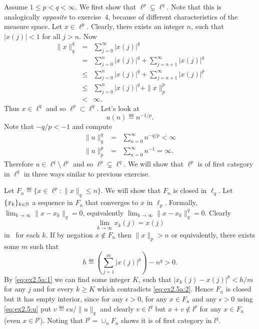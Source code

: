 \begin{enumerate}
Assume \(1\leq p < q < \infty\).
We first show that \(\ell^p \subsetneq \ell^q\).
Note that this is analogically \emph{opposite} to exercise~4, because
of different characteristics of the measure space.
Let \(x\in \ell^p\).
Clearly, there exists an integer $n$, such that \(|x(j)| < 1\) 
for all \(j>n\). 
Now
\begin{eqnarray*}
\|x\|_q^q
&=& \sum_{j=0}^\infty |x(j)|^q \\
&=& \sum_{j=0}^n |x(j)|^q + \sum_{j=n+1}^\infty |x(j)|^q \\
&\leq& \sum_{j=0}^n |x(j)|^q + \sum_{j=n+1}^\infty |x(j)|^p \\
&\leq& \sum_{j=0}^n |x(j)|^q + \|x\|_p^p \\
&<& \infty.
\end{eqnarray*}
Thus \(x\in \ell^q\) and so \(\ell^p \subset \ell^q\). 
Let's look at 
\begin{equation} \label{eq:ex2.5:u}
u(n) \eqdef n^{-1/p}.
\end{equation}
Note that \(-q/p < -1\) and compute
\begin{eqnarray*}
\|u\|_q^q &=& \sum_{n=0}^\infty n^{-q/p} < \infty \\
\|u\|_p^p &=& \sum_{n=0}^\infty n^{-1} = \infty.
\end{eqnarray*}
Therefore \(u\in \ell^q \setminus \ell^p\) and so \(\ell^p \subsetneq \ell^q\).
We will show that \(\ell^p\) is of first category in \(\ell^q\)
in three ways sinilar to previous exercise.
\begin{itemize}
   Let \(F_n \eqdef \{x\in \ell^p: \|x\|_q \leq n\}\).
   We will show that \(F_n\) is closed in \(\ell_q\).
   Let \(\{x_k\}_{k\in\mathbb{N}}\) a sequence in \(F_n\) that converges to $x$ 
   in \(\ell_p\). Formally, \(\lim_{k\to\infty} \|x-x_k\|_q = 0\), equivalently
   \(\lim_{k\to\infty} \|x-x_k\|_q^q = 0\).
   Clearly 
   \begin{equation} \label{eq:ex2.5a:1}
   \lim_{k\to\infty} x_k(j) = x(j) 
   \end{equation}
   in \C\ for each $k$.
   If by negation \(x\notin F_n\) then 
   \(\|x\|_p > n\) 
   or equivalently, there exists some $m$ such that
   \begin{equation} \label{eq:ex2.5a:2}
   h \eqdef \left(\sum_{j=1}^m |x(j)|^p\right) - n^q > 0.
   \end{equation}
   By \eqref{eq:ex2.5a:1} we can find some integer $K$, such that 
   \(|x_k(j) - x(j)|^p < h/m\) for any $j$ and for every \(k\geq K\)
   which contradicts \eqref{eq:ex2.5a:2}. Hence \(F_n\) is closed
   but it has empty interior, since 
   for any \(\epsilon > 0\), 
   for any \(x\in F_n\) and any \(\epsilon > 0\)
   using \eqref{eq:ex2.5:u} put \(v \eqdef \epsilon u/\|u\|_q\)
   and clearly \(v \in l^q\) but \(x+v \notin l^p\) for any \(x\in F_n\)
   (even \(x\in l^p\)). Noting that \(l^p = \cup_n F_n\)
   shows it is of first category in \(l^q\).
   

\end{itemize}
\end{enumerate}

